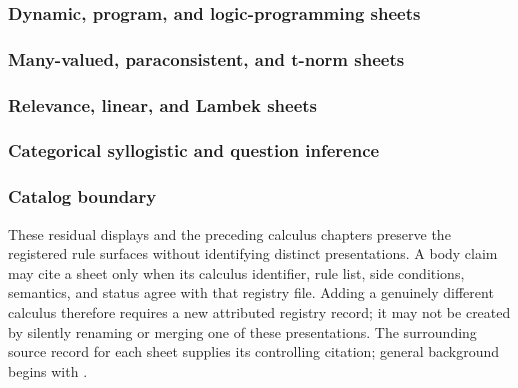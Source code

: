 \subsubsection{Dynamic, program, and logic-programming sheets}

\subsubsection{Many-valued, paraconsistent, and t-norm sheets}

\subsubsection{Relevance, linear, and Lambek sheets}

\subsubsection{Categorical syllogistic and question inference}

\subsubsection{Catalog boundary}

These residual displays and the preceding calculus chapters preserve the
registered rule surfaces without identifying distinct presentations. A body claim may cite a sheet only when
its calculus identifier, rule list, side conditions, semantics, and status
agree with that registry file. Adding a genuinely different calculus therefore
requires a new attributed registry record; it may not be created by silently
renaming or merging one of these presentations. The surrounding source record
for each sheet supplies its controlling citation; general background begins
with \cite{Prawitz1965,RobinsonVoronkov2001,BlackburnDeRijkeVenema2001}.


